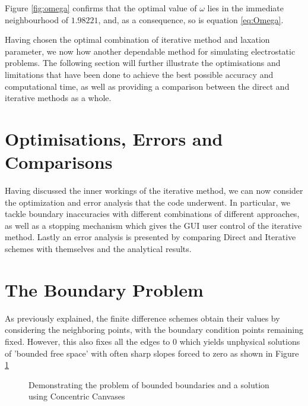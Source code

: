 \documentclass[a4paper]{article}
\begin{document}
Figure \ref{fig:omega} confirms that the optimal value of $\omega$ lies in the immediate neighbourhood of  $1.98221$, and, as a consequence, so is equation \ref{eq:Omega}. 


Having chosen the optimal combination of iterative method and laxation parameter, we now how another dependable method for simulating electrostatic problems. The following section will further illustrate the optimisations and limitations that have been done to achieve the best possible accuracy and computational time, as well as providing a comparison between the direct and iterative methods as a whole.


\section{Optimisations, Errors and Comparisons}
Having discussed the inner workings of the iterative method, we can now consider the optimization and error analysis that the code underwent. In particular, we tackle boundary inaccuracies with different combinations of different approaches, as well as a stopping mechanism which gives the GUI user control of the iterative method. Lastly an error analysis is presented by comparing Direct and Iterative schemes with themselves and the analytical results. 
    
\section{The Boundary Problem}
As previously explained, the finite difference schemes obtain their values by considering the neighboring points, with the boundary condition points remaining fixed. However, this also fixes all the edges to 0 which yields unphysical solutions  of 'bounded free space' with often sharp slopes forced to zero as shown in Figure \ref{fig:boundprob}

\begin{figure}[!h]
  \centering
  \hfill
  \caption{Demonstrating the problem of bounded boundaries and a solution using Concentric Canvases}
  \label{fig:boundprob}
\end{figure}
\end{document}
